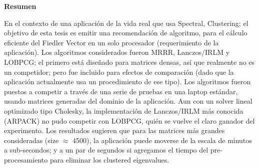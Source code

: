 \thispagestyle{plain}
\begin{center}

  \vspace{0.4cm}


  \vspace{0.9cm}
  \textbf{Resumen}
\end{center}

    En el contexto de una aplicación de la vida real que usa Spectral, 
    Clustering; el objetivo de esta tesis es emitir una recomendación
    de algoritmo, para el cálculo eficiente del Fiedler Vector en un
    solo procesador (requerimiento de la aplicación). Los algoritmos
    considerados fueron MRRR, Lanczos/IRLM y LOBPCG; el primero está
    diseñado para matrices densas, así que realmente no es un competidor;
    pero fue incluido para efectos de comparación (dado que la aplicación
    actualmente usa un procedimiento de ese tipo). Los algoritmos fueron
    puestos a competir a través de una serie de pruebas en una
    laptop estándar, usando matrices generadas del dominio de la aplicación. 
    Aun con un solver lineal optimizado tipo Cholesky, la implementación
    de Lanczos/IRLM más conocida (ARPACK) no pudo competir con LOBPCG,
    quién se vuelve el claro  
    ganador del experimento. Los resultados sugieren que para las matrices más
    grandes consideradas (size $\approx$ 4500), la aplicación puede moverse
    de la escala de minutos a sub-secondos; y a un par de segundos si
    agregamos el tiempo del pre-procesamiento para eliminar los
    clustered eigenvalues.  
